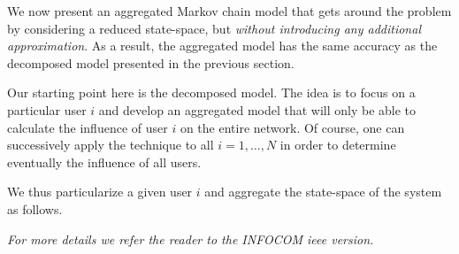 \documentclass[10pt, conference, letterpaper]{IEEEtran}
\begin{document}
We now present an aggregated Markov chain model that gets around the problem by considering a reduced state-space, but \textit{without introducing any additional approximation}. As a result, the aggregated model has the same accuracy as the decomposed model presented in the previous section.

Our starting point here is the decomposed model. The idea is to focus on a particular user $i$ and develop an aggregated model that will only be able to calculate the influence of user $i$ on the entire network. Of course, one can successively apply the technique to all $i=1,\ldots,N$ in order to determine eventually the influence of all users.



We thus particularize a given user $i$ and aggregate the state-space of the system as follows. 


\textit{For more details we refer the reader to the INFOCOM ieee version.}
\end{document}
